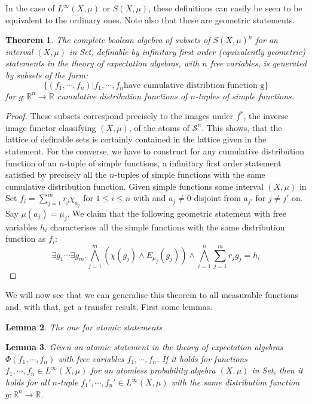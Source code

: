 \documentclass[a4paper]{amsproc}
\theoremstyle{plain}
\newtheorem{theorem}{Theorem}[section]
\newtheorem{lemma}[theorem]{Lemma}
\theoremstyle{definition}
\theoremstyle{remark}
\numberwithin{equation}{section}
\begin{document}
In the case of $L^\infty(X,\mu)$ or $S(X,\mu)$, these definitions can easily be seen to be equivalent to the ordinary ones. Note also that these are geometric statements. 
\begin{theorem}
The complete boolean algebra of subsets of $S(X,\mu)^n$ for an interval $(X,\mu)$ in Set, definable by infinitary first order (equivalently geometric) statements in the theory of expectation algebras, with $n$ free variables, is generated by subsets of the form:
\[\{(f_1,\cdots, f_n)| f_1,\cdots, f_n\text{have cumulative distribtion function g}\} \]
for $g:\mathbb{R}^n\rightarrow\mathbb{R}$ cumulative distribution functions of $n$-tuples of simple functions.
\end{theorem}
\begin{proof}
These subsets correspond precisely to the images under $f^*$, the inverse image functor classifying $(X,\mu)$, of the atoms of $\mathcal{S}^n$. This shows, that the lattice of definable sets is certainly contained in the lattice given in the statement.\newline
\indent For the converse, we have to construct for any cumulative distribution function of an $n$-tuple of simple functions, a infinitary first order statement satisfied by precisely all the $n$-tuples of simple functions with the same cumulative distribution function. Given simple functions some interval $(X,\mu)$ in Set $f_i=\sum_{j=1}^{m} r_{j}\chi_{a_j}$ for $1\leq i\leq n$ with and $a_j\neq 0$ disjoint from $a_{j'}$ for  $j\neq j'$ on. Say $\mu(a_{j})=\mu_{j}$.  We claim that the following geometric statement with free variables $h_i$ characterises all the simple functions with the same distribution function as $f_i$:
\[\exists g_1\cdots \exists g_m. \bigwedge_{j=1}^m(\chi (g_j)\wedge E_{\mu_{j}}(g_j))\wedge \bigwedge_{i=1}^n\sum_{j=1}^m r_jg_j=h_i   \]  %
\end{proof}
We will now see that we can generalise this theorem to all measurable functions and, with that, get a transfer result. First some lemmas.
\begin{lemma} The one for atomic statements
\end{lemma}
\begin{lemma}\label{atomic_L_infty} Given an atomic statement in the theory of expectation algebras $\Phi(f_1,\cdots,f_n)$ with free variables $f_1,\cdots, f_n$. If it holds for functions $f_1,\cdots ,f_n\in L^\infty(X,\mu)$ for an atomless probability algebra $(X,\mu)$ in Set, then it holds for all $n$-tuple $f_1',\cdots, f_n'\in L^\infty(X,\mu)$ with the same distribution function $g:\mathbb{R}^n\rightarrow \mathbb{R}$.
\end{lemma}
\end{document}
